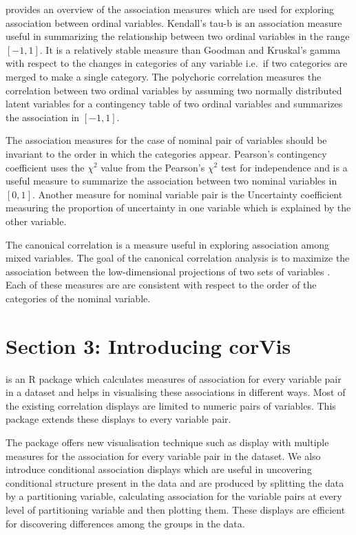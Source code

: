 \citet{agresti2010analysis} provides an overview of the association
measures which are used for exploring association between ordinal
variables. Kendall's tau-b \citep{kendall1945treatment} is an
association measure useful in summarizing the relationship between two
ordinal variables in the range \([-1,1]\). It is a relatively stable
measure than Goodman and Kruskal's gamma with respect to the changes in
categories of any variable i.e.~if two categories are merged to make a
single category. The polychoric correlation \citep{olsson1979maximum}
measures the correlation between two ordinal variables by assuming two
normally distributed latent variables for a contingency table of two
ordinal variables and summarizes the association in \([-1,1]\).

The association measures for the case of nominal pair of variables
should be invariant to the order in which the categories appear.
Pearson's contingency coefficient uses the \({\chi}^2\) value from the
Pearson's \({\chi}^2\) test for independence and is a useful measure to
summarize the association between two nominal variables in \([0,1]\).
Another measure for nominal variable pair is the Uncertainty coefficient
\citep{theil1970estimation} measuring the proportion of uncertainty in
one variable which is explained by the other variable.

The canonical correlation is a measure useful in exploring association
among mixed variables. The goal of the canonical correlation analysis is
to maximize the association between the low-dimensional projections of
two sets of variables \citep{hardle2019applied}. Each of these measures
are are consistent with respect to the order of the categories of the
nominal variable.

\hypertarget{section-3-introducing-corvis}{%
\section{Section 3: Introducing
corVis}\label{section-3-introducing-corvis}}

 is an R package which calculates measures of
association for every variable pair in a dataset and helps in
visualising these associations in different ways. Most of the existing
correlation displays are limited to numeric pairs of variables. This
package extends these displays to every variable pair.

The package offers new visualisation technique such as display with
multiple measures for the association for every variable pair in the
dataset. We also introduce conditional association displays which are
useful in uncovering conditional structure present in the data and are
produced by splitting the data by a partitioning variable, calculating
association for the variable pairs at every level of partitioning
variable and then plotting them. These displays are efficient for
discovering differences among the groups in the data.

